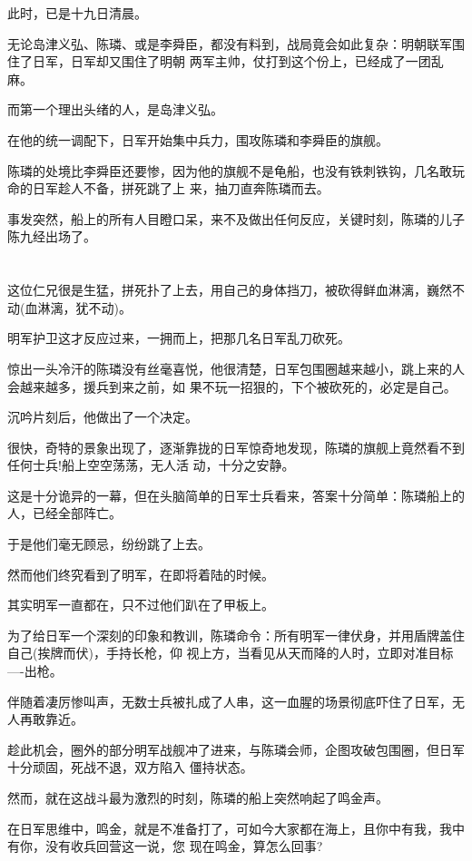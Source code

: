 \documentclass[11pt,a4paper,onecolumn]{article}
\begin{document}
此时，已是十九日清晨。

无论岛津义弘、陈璘、或是李舜臣，都没有料到，战局竟会如此复杂：明朝联军围住了日军，日军却又围住了明朝
两军主帅，仗打到这个份上，已经成了一团乱麻。

而第一个理出头绪的人，是岛津义弘。

在他的统一调配下，日军开始集中兵力，围攻陈璘和李舜臣的旗舰。

陈璘的处境比李舜臣还要惨，因为他的旗舰不是龟船，也没有铁刺铁钩，几名敢玩命的日军趁人不备，拼死跳了上
来，抽刀直奔陈璘而去。

事发突然，船上的所有人目瞪口呆，来不及做出任何反应，关键时刻，陈璘的儿子陈九经出场了。

\section[\thesection]{}

这位仁兄很是生猛，拼死扑了上去，用自己的身体挡刀，被砍得鲜血淋漓，巍然不动(血淋漓，犹不动)。

明军护卫这才反应过来，一拥而上，把那几名日军乱刀砍死。

惊出一头冷汗的陈璘没有丝毫喜悦，他很清楚，日军包围圈越来越小，跳上来的人会越来越多，援兵到来之前，如
果不玩一招狠的，下个被砍死的，必定是自己。

沉吟片刻后，他做出了一个决定。

很快，奇特的景象出现了，逐渐靠拢的日军惊奇地发现，陈璘的旗舰上竟然看不到任何士兵!船上空空荡荡，无人活
动，十分之安静。

这是十分诡异的一幕，但在头脑简单的日军士兵看来，答案十分简单：陈璘船上的人，已经全部阵亡。

于是他们毫无顾忌，纷纷跳了上去。

然而他们终究看到了明军，在即将着陆的时候。

其实明军一直都在，只不过他们趴在了甲板上。

为了给日军一个深刻的印象和教训，陈璘命令：所有明军一律伏身，并用盾牌盖住自己(挨牌而伏)，手持长枪，仰
视上方，当看见从天而降的人时，立即对准目标----出枪。

伴随着凄厉惨叫声，无数士兵被扎成了人串，这一血腥的场景彻底吓住了日军，无人再敢靠近。

趁此机会，圈外的部分明军战舰冲了进来，与陈璘会师，企图攻破包围圈，但日军十分顽固，死战不退，双方陷入
僵持状态。

然而，就在这战斗最为激烈的时刻，陈璘的船上突然响起了鸣金声。

在日军思维中，鸣金，就是不准备打了，可如今大家都在海上，且你中有我，我中有你，没有收兵回营这一说，您
现在鸣金，算怎么回事?
\end{document}
